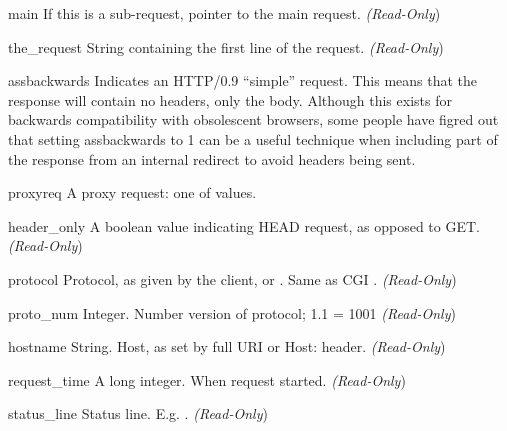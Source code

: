 \begin{memberdesc}[request]{main}
  If this is a sub-request, pointer to the main request. 
  \emph{(Read-Only})
\end{memberdesc}

\begin{memberdesc}[request]{the_request}
  String containing the first line of the request.
  \emph{(Read-Only})
\end{memberdesc}

\begin{memberdesc}[request]{assbackwards}
  Indicates an HTTP/0.9 ``simple'' request. This means that the
  response will contain no headers, only the body. Although this
  exists for backwards compatibility with obsolescent browsers, some
  people have figred out that setting assbackwards to 1 can be a
  useful technique when including part of the response from an
  internal redirect to avoid headers being sent.
\end{memberdesc}

\begin{memberdesc}[request]{proxyreq}
  A proxy request: one of  values.
\end{memberdesc}

\begin{memberdesc}[request]{header_only}
  A boolean value indicating HEAD request, as opposed to GET. 
  \emph{(Read-Only})
\end{memberdesc}

\begin{memberdesc}[request]{protocol}
  Protocol, as given by the client, or . Same as CGI .
  \emph{(Read-Only})
\end{memberdesc}

\begin{memberdesc}[request]{proto_num}
  Integer. Number version of protocol; 1.1 = 1001 
  \emph{(Read-Only})
\end{memberdesc}

\begin{memberdesc}[request]{hostname}
  String. Host, as set by full URI or Host: header.
  \emph{(Read-Only})
\end{memberdesc}

\begin{memberdesc}[request]{request_time}
  A long integer. When request started.
  \emph{(Read-Only})
\end{memberdesc}

\begin{memberdesc}[request]{status_line}
  Status line. E.g. . 
  \emph{(Read-Only})
\end{memberdesc}

